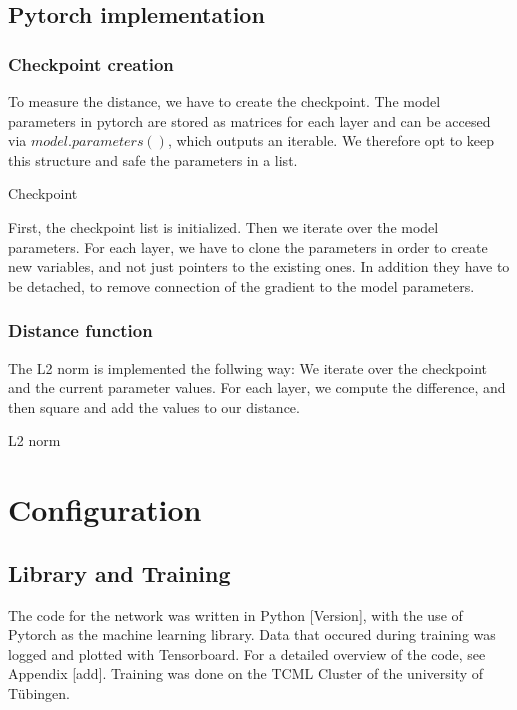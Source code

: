 \subsection{Pytorch implementation}

\subsubsection{Checkpoint creation}
To measure the distance, we have to create the checkpoint. The model parameters
in pytorch are stored as matrices for each layer and can be accesed via
$model.parameters()$, which outputs an iterable. We therefore opt to keep this
structure and safe the parameters in a list.
\begin{algorithm}[h!]
    \caption{Checkpoint}\label{alg:Checkpoint}
    \lstset{language=Python}
    
\end{algorithm}
\newline
First, the checkpoint list is initialized. Then we iterate over the model
parameters. For each layer, we have to clone the parameters in order to create
new variables, and not just pointers to the existing ones. In addition they have
to be detached, to remove connection of the gradient to the model parameters.

\subsubsection{Distance function}
The L2 norm is implemented the follwing way: We iterate over the checkpoint and
the current parameter values. For each layer, we compute the difference, and
then square and add the values to our distance.
\begin{algorithm}[h!]
    \caption{L2 norm}\label{alg:L2Norm}
    \lstset{language=Python}
    
\end{algorithm}



\section{Configuration}

\subsection{Library and Training}
The code for the network was written in Python [Version], with the use of
Pytorch \cite{NEURIPS2019_9015} as the machine learning library. Data that occured during training was
logged and plotted with Tensorboard. For a detailed overview of the code, see
Appendix [add]. Training was done on the TCML Cluster of the university of Tübingen.

